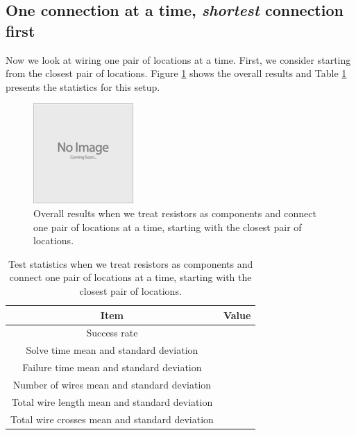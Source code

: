 \subsection{One connection at a time, \textit{shortest} connection first}

Now we look at wiring one pair of locations at a time. First, we consider
starting from the closest pair of locations. Figure \ref{fig:as_comp_pair_s}
shows the overall results and Table \ref{tb:as_comp_pair_s} presents the
statistics for this setup.

\begin{figure}[H]
\begin{center}
\includegraphics{Images/placeholder.jpg}
\caption{Overall results when we treat resistors as components and connect one
pair of locations at a time, starting with the closest pair of locations.}
\label{fig:as_comp_pair_s}
\end{center}
\end{figure}

\begin{table}[H]
\begin{center}
\begin{singlespace}
\begin{tabular}{| c | c |}
\hline
Item & Value \\
\hline\hline
Success rate & \\
Solve time mean and standard deviation & \\
Failure time mean and standard deviation & \\
Number of wires mean and standard deviation & \\
Total wire length mean and standard deviation & \\
Total wire crosses mean and standard deviation & \\
\hline
\end{tabular}
\end{singlespace}
\end{center}
\label{tb:as_comp_pair_s}
\caption{Test statistics when we treat resistors as components and connect one
pair of locations at a time, starting with the closest pair of locations.}
\end{table}

